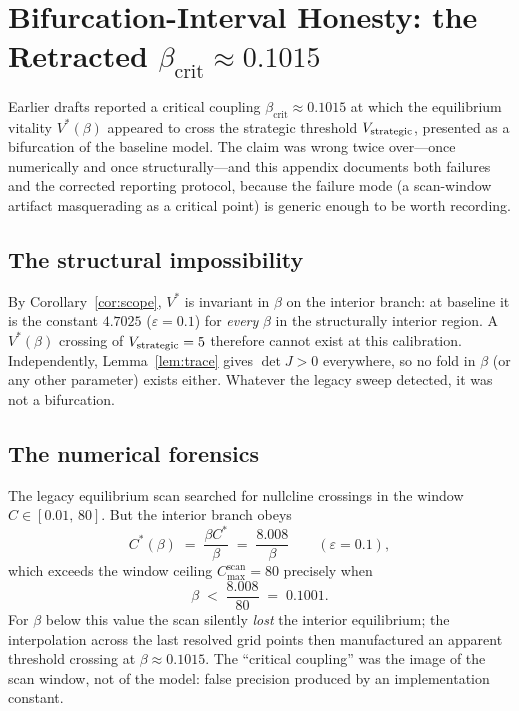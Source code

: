 \section{Bifurcation-Interval Honesty: the Retracted
$\beta_{\mathrm{crit}}\approx0.1015$}
\label{app:bifurcation}

Earlier drafts reported a critical coupling
$\beta_{\mathrm{crit}}\approx0.1015$ at which the equilibrium vitality
$V^{*}(\beta)$ appeared to cross the strategic threshold $V_{\mathrm{strategic}}$,
presented as a bifurcation of the baseline model. The claim was wrong
twice over---once numerically and once structurally---and this appendix
documents both failures and the corrected reporting protocol, because the
failure mode (a scan-window artifact masquerading as a critical point) is
generic enough to be worth recording.

\subsection{The structural impossibility}

By Corollary~\ref{cor:scope}, $V^{*}$ is invariant in $\beta$ on the
interior branch: at baseline it is the constant $4.7025$
($\varepsilon=0.1$) for \emph{every} $\beta$ in the structurally interior
region. A $V^{*}(\beta)$ crossing of $V_{\mathrm{strategic}}=5$ therefore cannot exist at
this calibration. Independently, Lemma~\ref{lem:trace} gives
$\det J>0$ everywhere, so no fold in $\beta$ (or any other parameter)
exists either. Whatever the legacy sweep detected, it was not a
bifurcation.

\subsection{The numerical forensics}

The legacy equilibrium scan searched for nullcline crossings in the window
$C\in[0.01,\,80]$. But the interior branch obeys
\[
C^{*}(\beta)\;=\;\frac{\beta C^{*}}{\beta}\;=\;\frac{8.008}{\beta}
\qquad(\varepsilon=0.1),
\]
which exceeds the window ceiling $C_{\max}^{\mathrm{scan}}=80$ precisely
when
\[
\beta \;<\; \frac{8.008}{80} \;=\; 0.1001 .
\]
For $\beta$ below this value the scan silently \emph{lost} the interior
equilibrium; the interpolation across the last resolved grid points then
manufactured an apparent threshold crossing at $\beta\approx0.1015$. The
``critical coupling'' was the image of the scan window, not of the model:
false precision produced by an implementation constant.


